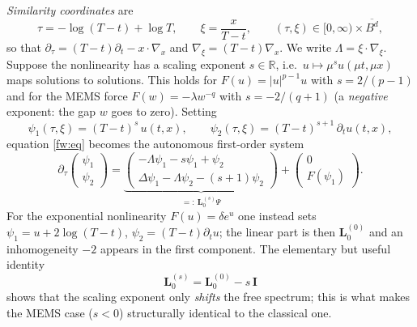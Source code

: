 \emph{Similarity coordinates} are
\[
  \tau=-\log(T-t)+\log T,\qquad \xi=\frac{x}{T-t},\qquad (\tau,\xi)\in[0,\infty)\times\overline{B^d},
\]
so that $\partial_\tau=(T-t)\partial_t-x\cdot\nabla_x$ and
$\nabla_\xi=(T-t)\nabla_x$. We write $\Lambda=\xi\cdot\nabla_\xi$.
Suppose the nonlinearity has a scaling exponent $s\in\mathbb R$, i.e.\
$u\mapsto \mu^{s}u(\mu t,\mu x)$ maps solutions to solutions. This holds for
$F(u)=|u|^{p-1}u$ with $s=2/(p-1)$ and for the MEMS force $F(w)=-\lambda
w^{-q}$ with $s=-2/(q+1)$ (a \emph{negative} exponent: the gap $w$ goes to
zero). Setting
\begin{equation}\label{fw:psi}
  \psi_1(\tau,\xi)=(T-t)^{s}\,u(t,x),\qquad \psi_2(\tau,\xi)=(T-t)^{s+1}\,\partial_tu(t,x),
\end{equation}
equation \eqref{fw:eq} becomes the autonomous first-order system
\begin{equation}\label{fw:system}
  \partial_\tau\begin{pmatrix}\psi_1\\ \psi_2\end{pmatrix}
  =\underbrace{\begin{pmatrix}-\Lambda\psi_1-s\psi_1+\psi_2\\ \Delta\psi_1-\Lambda\psi_2-(s+1)\psi_2\end{pmatrix}}_{=:\ \mathbf L_0^{(s)}\Psi}
  +\begin{pmatrix}0\\ F(\psi_1)\end{pmatrix}.
\end{equation}
For the exponential nonlinearity $F(u)=\delta e^u$ one instead sets
$\psi_1=u+2\log(T-t)$, $\psi_2=(T-t)\partial_tu$; the linear part is then
$\mathbf L_0^{(0)}$ and an inhomogeneity $-2$ appears in the first component.
The elementary but useful identity
\begin{equation}\label{fw:shift}
  \mathbf L_0^{(s)}=\mathbf L_0^{(0)}-s\,\mathbf I
\end{equation}
shows that the scaling exponent only \emph{shifts} the free spectrum; this is
what makes the MEMS case ($s<0$) structurally identical to the classical one.

